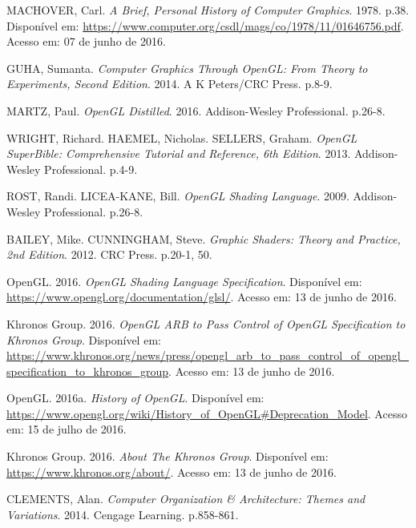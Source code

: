 \documentclass[brazil,ruledheader]{abntifes}
\begin{document}
\begin{thebibliography}{1}
\makeatletter
\renewcommand\@biblabel[1]{}
\makeatother

MACHOVER, Carl. \textit{A Brief, Personal History of Computer Graphics}. 1978. p.38. Disponível em: \url{https://www.computer.org/csdl/mags/co/1978/11/01646756.pdf}.
Acesso em: 07 de junho de 2016.

GUHA, Sumanta. \textit{Computer Graphics Through OpenGL: From Theory to Experiments, Second Edition}. 2014. A K Peters/CRC Press. p.8-9.

MARTZ, Paul. \textit{OpenGL Distilled}. 2016. Addison-Wesley Professional. p.26-8.

WRIGHT, Richard. HAEMEL, Nicholas. SELLERS, Graham. \textit{OpenGL SuperBible: Comprehensive Tutorial and Reference, 6th Edition}. 2013. Addison-Wesley Professional. p.4-9.

ROST, Randi. LICEA-KANE, Bill. \textit{OpenGL Shading Language}. 2009. Addison-Wesley Professional. p.26-8.


BAILEY, Mike. CUNNINGHAM, Steve. \textit{Graphic Shaders: Theory and Practice, 2nd Edition}. 2012. CRC Press. p.20-1, 50.

OpenGL. 2016. \textit{OpenGL Shading Language Specification}. Disponível em: \url{https://www.opengl.org/documentation/glsl/}.
Acesso em: 13 de junho de 2016.

Khronos Group. 2016. \textit{OpenGL ARB to Pass Control of OpenGL Specification to Khronos Group}. Disponível em: \url{https://www.khronos.org/news/press/opengl_arb_to_pass_control_of_opengl_specification_to_khronos_group}.
Acesso em: 13 de junho de 2016.

OpenGL. 2016a. \textit{History of OpenGL}. Disponível em: \url{https://www.opengl.org/wiki/History_of_OpenGL#Deprecation_Model}.
Acesso em: 15 de julho de 2016.

Khronos Group. 2016. \textit{About The Khronos Group}. Disponível em: \url{https://www.khronos.org/about/}.
Acesso em: 13 de junho de 2016.


CLEMENTS, Alan. \textit{Computer Organization \& Architecture: Themes and Variations}. 2014. Cengage Learning. p.858-861.


\end{thebibliography}
\end{document}
